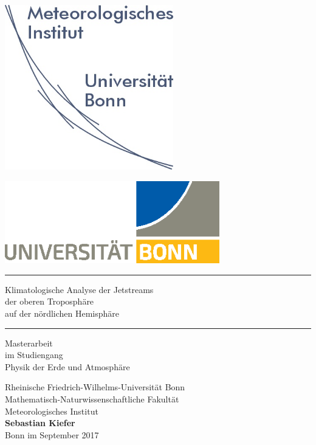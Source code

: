 \begin{titlingpage}

\begin{center}%
\begin{minipage}{0.45\textwidth} %
  \begin{center}
  \includegraphics[width=0.55\textwidth]{01-figures/c-logo_miub} \\
  \end{center}
\end{minipage} 
\hfill %
\begin{minipage}{0.45\textwidth} %
  \begin{center}
  \includegraphics[width=0.7\textwidth]{01-figures/c-logo_uni_2017} \\
  \end{center}
\end{minipage}

\vspace{1cm} \hrule \vspace{1cm}

\begin{LARGE}
  Klimatologische Analyse der Jetstreams \\
  der oberen Troposphäre \\
  auf der nördlichen Hemisphäre \\
\end{LARGE}
\vspace{1cm} \hrule \vfill

\normalsize 
Masterarbeit\\im Studiengang\\
Physik der Erde und Atmosphäre
     
\vfill
Rheinische Friedrich-Wilhelms-Universität Bonn\\
Mathematisch-Naturwissenschaftliche Fakultät\\
Meteorologisches Institut\\

\vfill
\textbf{Sebastian Kiefer} \\ %
Bonn im September 2017
\end{center}
\end{titlingpage}

